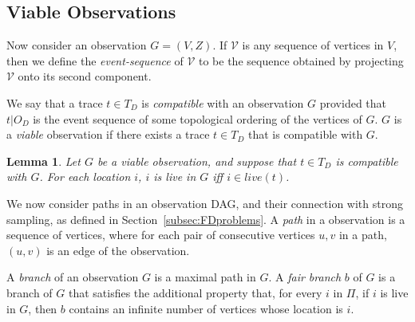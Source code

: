 \documentclass[11pt]{article}
\numberwithin{theorem}{section}
\newtheorem{lemma}[theorem]{Lemma}
\begin{document}
\subsection{Viable Observations}

Now consider an observation $G = (V,Z)$. 
If $\mathcal{V}$ is any sequence of vertices in $V$, then we define
the \emph{event-sequence} of $\mathcal{V}$ to be the sequence obtained
by projecting $\mathcal{V}$ onto its second component.

We say that a trace $t \in T_D$ is \emph{compatible} with an
observation $G$ provided that $t|O_D$ is the event sequence of some
topological ordering of the vertices of $G$.  
$G$ is a \emph{viable} observation if there exists a trace $t \in T_D$
that is compatible with $G$.

\begin{lemma}
\label{prop:liveInObsAndTrace}
Let $G$ be a viable observation, and suppose that $t \in T_D$ is
compatible with $G$. 
For each location $i$, $i$ is live in $G$ iff $i \in live(t)$.
\end{lemma}

We now consider paths in an observation DAG, and their connection with
strong sampling, as defined in Section~\ref{subsec:FDproblems}. A \emph{path} in a observation is a sequence of vertices, where for each pair of consecutive vertices $u,v$ in a path, $(u,v)$ is an edge of the observation.


A \emph{branch} of an observation $G$ is a maximal path in $G$.
A \emph{fair branch} $b$ of $G$ is a branch of $G$ that satisfies the
additional property that, for every $i$ in $\Pi$, if $i$ is live in $G$, then
$b$ contains an infinite number of vertices whose location is $i$.
\end{document}

